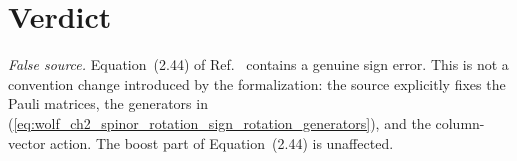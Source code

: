 \documentclass{article}
\begin{document}
\section{Verdict}

\emph{False source.} Equation~(2.44) of Ref.~\cite{Wolf2012Quantum} contains a
genuine sign error. This is not a convention change introduced by the
formalization: the source explicitly fixes the Pauli matrices, the generators
in (\ref{eq:wolf_ch2_spinor_rotation_sign_rotation_generators}), and the
column-vector action. The boost part of Equation~(2.44) is unaffected.



\end{document}
